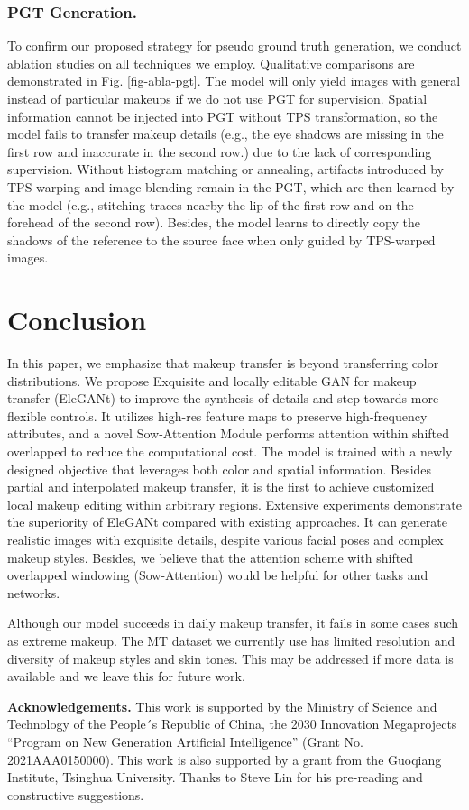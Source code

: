\subsubsection{PGT Generation.} To confirm our proposed strategy for pseudo ground truth generation, we conduct ablation studies on all techniques we employ. Qualitative comparisons are demonstrated in Fig. \ref{fig-abla-pgt}. The model will only yield images with general instead of particular makeups if we do not use PGT for supervision. Spatial information cannot be injected into PGT without TPS transformation, so the model fails to transfer makeup details (e.g., the eye shadows are missing in the first row and inaccurate in the second row.) due to the lack of corresponding supervision. Without histogram matching or annealing, artifacts introduced by TPS warping and image blending remain in the PGT, which are then learned by the model (e.g., stitching traces nearby the lip of the first row and on the forehead of the second row). Besides, the model learns to directly copy the shadows of the reference to the source face when only guided by TPS-warped images.

\section{Conclusion}
In this paper, we emphasize that makeup transfer is beyond transferring color distributions. 
We propose Exquisite and locally editable GAN for makeup transfer (EleGANt) to improve the synthesis of details and step towards more flexible controls. It utilizes high-res feature maps to preserve high-frequency attributes, and a novel Sow-Attention Module performs attention within shifted overlapped to reduce the computational cost. The model is trained with a newly designed objective that leverages both color and spatial information. Besides partial and interpolated makeup transfer, it is the first to achieve customized local makeup editing within arbitrary regions. Extensive experiments demonstrate the superiority of EleGANt compared with existing approaches. It can generate realistic images with exquisite details, despite various facial poses and complex makeup styles. %
Besides, we believe that the attention scheme with shifted overlapped windowing (Sow-Attention) would be helpful for other tasks and networks. 

Although our model succeeds in daily makeup transfer, it fails in some cases such as extreme makeup. The MT dataset \cite{BeautyGAN} we currently use has limited resolution and diversity of makeup styles and skin tones. This may be addressed if more data is available and we leave this for future work.

\bigskip\noindent\textbf{Acknowledgements.} This work is supported by the Ministry of Science and Technology of the People´s Republic of China, the 2030 Innovation Megaprojects ``Program on New Generation Artificial Intelligence'' (Grant No. 2021AAA0150000). This work is also supported by a grant from the Guoqiang Institute, Tsinghua University. Thanks to Steve Lin for his pre-reading and constructive suggestions.

